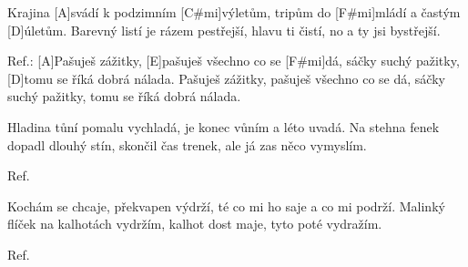 
Krajina [A]svádí k podzimním [C#mi]výletům,
tripům do [F#mi]mládí a častým [D]\null úletům.
Barevný listí je rázem pestřejší,
hlavu ti čistí, no a ty jsi bystřejší.

Ref.: [A]Pašuješ zážitky, [E]pašuješ všechno co se [F#mi]dá,
sáčky suchý pažitky, [D]tomu se říká dobrá nálada.
Pašuješ zážitky, pašuješ všechno co se dá,
sáčky suchý pažitky, tomu se říká dobrá nálada.

Hladina tůní pomalu vychladá,
je konec vůním a léto uvadá.
Na stehna fenek dopadl dlouhý stín,
skončil čas trenek, ale já zas něco vymyslím.

Ref.

Kochám se chcaje, překvapen výdrží,
té co mi ho saje a co mi podrží.
Malinký flíček na kalhotách vydržím,
kalhot dost maje, tyto poté vydražím.

Ref.
